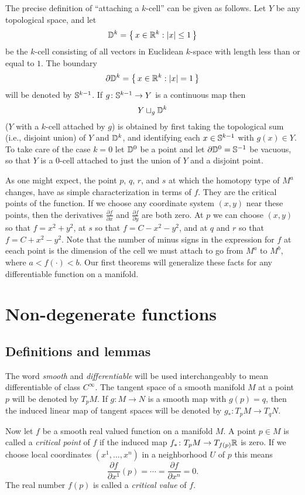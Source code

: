 The precise definition of ``attaching a \(k\)-cell'' can be given as
follows. Let \(Y\) be any topological space, and let
\[
  \mathbb{D}^k=\bigl\{\,x\in\mathbb{R}^k: |x|\leq 1\,\bigr\}
\]
be the \(k\)-cell consisting of all vectors in Euclidean \(k\)-space with
length less than or equal to \(1\). The boundary
\[
  \partial \mathbb{D}^k=\bigl\{\,x\in\mathbb{R}^k:|x|=1\,\bigr\}
\]
will be denoted by \(\mathbb{S}^{k-1}\). If \(g\colon \mathbb{S}^{k-1}\to Y\) is a continuous
map then
\[
  Y\sqcup_g \mathbb{D}^k
\]
(\(Y\) with a \(k\)-cell attached by \(g\)) is obtained by first taking the
topological sum (i.e., disjoint union) of \(Y\) and \(\mathbb{D}^k\), and
identifying each \(x\in \mathbb{S}^{k-1}\) with \(g(x)\in Y\). To take care of
the case \(k=0\) let \(\mathbb{D}^0\) be a point and let
\(\partial\mathbb{D}^0=\mathbb{S}^{-1}\) be vacuous, so that \(Y\) is a \(0\)-cell
attached to just the union of \(Y\) and a disjoint point.

As one might expect, the point \(p\), \(q\), \(r\), and \(s\) at which the
homotopy type of \(M^a\) changes, have as simple characterization in terms
of \(f\). They are the critical points of the function. If we choose any
coordinate system \((x,y)\) near these points, then the derivatives
\(\frac{\partial f}{\partial x}\) and \(\frac{\partial f}{\partial y}\) are
both zero. At \(p\) we can choose \((x,y)\) so that \(f=x^2+y^2\), at \(s\)
so that \(f=C-x^2-y^2\), and at \(q\) and \(r\) so that
\(f=C+x^2-y^2\). Note that the number of minus signs in the expression for
\(f\) at eeach point is the dimension of the cell we must attach to go from
\(M^a\) to \(M^b\), where \(a<f(\cdot)<b\). Our first theorems will
generalize these facts for any differentiable function on a manifold.

\section{Non-degenerate functions}
\subsection{Definitions and lemmas}
The word \emph{smooth} and \emph{differentiable} will be used
interchangeably to mean differentiable of class \(C^\infty\). The tangent
space of a smooth manifold \(M\) at a point \(p\) will be denoted by
\(T_pM\). If \(g\colon M\to N\) is a smooth map with \(g(p)=q\), then the
induced linear map of tangent spaces will be denoted by \(g_*\colon T_pM\to
T_qN\).

Now let \(f\) be a smooth real valued function on a manifold \(M\). A point
\(p\in M\) is called a \emph{critical point} of \(f\) if the induced map
\(f_*\colon T_pM\to T_{f(p)}\mathbb{R}\) is zero. If we choose local coordinates
\((x^1,\dotsc,x^n)\) in a neighborhood \(U\) of \(p\) this means
\[
  \frac{\partial f}{\partial x^1}(p)=\dotsb=\frac{\partial f}{\partial x^n}=0.
\]
The real number \(f(p)\) is called a \emph{critical value} of \(f\).

